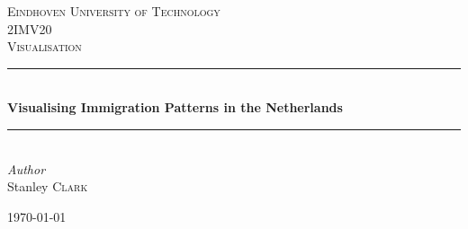 \documentclass[11pt,a4paper,titlepage]{article}
\begin{document}
\begin{titlepage} %
	\newcommand{\HRule}{\rule{\linewidth}{0.5mm}} %
	
	
	\textsc{\LARGE Eindhoven University of Technology}\\[1.5cm] %
	
	\textsc{\Large 2IMV20}\\[0.5cm] %
	
	\textsc{\large Visualisation}\\[0.5cm] %
	
	
	\HRule\\[0.4cm]
	
	{\huge\bfseries Visualising Immigration Patterns in the Netherlands}\\[0.4cm] %
	
	\HRule\\[1.5cm]
	
	
	{\large\textit{Author}}\\
	Stanley \textsc{Clark} %
	
	
	\vfill\vfill\vfill %
	
	{\large\today} %
	
	
	\vfill %
	
\end{titlepage}

\tableofcontents
\clearpage
\end{document}
